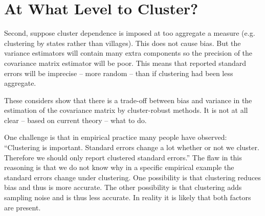 \section{At What Level to Cluster?}


Second, suppose cluster dependence is imposed at too aggregate a measure (e.g. clustering by states rather than villages). This does not cause bias. But the variance estimators will contain many extra components so the precision of the covariance matrix estimator will be poor. This means that reported standard errors will be imprecise -- more random -- than if clustering had been less aggregate.

These considers show that there is a trade-off between bias and variance in the estimation of the covariance matrix by cluster-robust methods. It is not at all clear -- based on current theory -- what to do. 

One challenge is that in empirical practice many people have observed: ``Clustering is important. Standard errors change a lot whether or not we cluster. Therefore we should only report clustered standard errors.'' The flaw in this reasoning is that we do not know why in a specific empirical example the standard errors change under clustering. One possibility is that clustering reduces bias and thus is more accurate. The other possibility is that clustering adds sampling noise and is thus less accurate. In reality it is likely that both factors are present.

